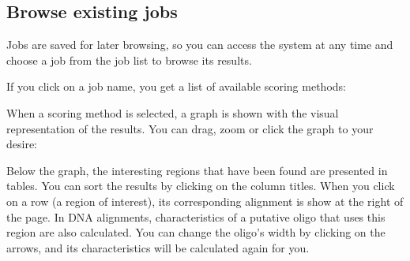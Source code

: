 \documentclass[12pt,oneside,a4paper,english]{article}  %
\begin{document}
\subsection{Browse existing jobs}

Jobs are saved for later browsing, so you can access the system at any time and choose a job from the job list to browse its results.

If you click on a job name, you get a list of available scoring methods:

		
When a scoring method is selected, a graph is shown with the visual representation of the results. You can drag, zoom or click the graph to your desire:


Below the graph, the interesting regions that have been found are presented in tables. You can sort the results by clicking on the column titles. When you click on a row (a region of interest), its corresponding alignment is show at the right of the page. In DNA alignments, characteristics of a putative oligo that uses this region are also calculated. You can change the oligo's width by clicking on the arrows, and its characteristics will be calculated again for you.




%
\end{document}
